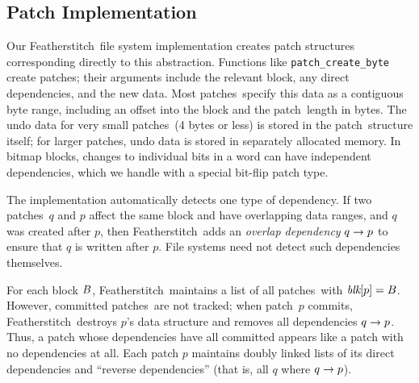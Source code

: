 \documentclass[9pt,twocolumn,letterpaper]{article}
\newcommand{\Kudos}{Featherstitch}
\newcommand{\patch}{patch}
\newcommand{\patches}{patches}
\begin{document}

\subsection{Patch Implementation}
\label{sec:patch:noop}

Our \Kudos\ file system implementation creates patch structures
corresponding directly to this abstraction.
%
Functions like \texttt{patch\_\-create\_\-byte} create patches;
%
their arguments include the relevant block, any
direct dependencies, and the new data.
%
Most \patches\ specify this data as a contiguous byte range, including an
offset into the block and the \patch\ length in bytes.
%
The undo data for very small \patches\ (4 bytes or less) is stored in the
\patch\ structure itself; for larger \patches, undo data is stored in
separately allocated memory.
%
In bitmap blocks, changes to individual bits in a word can have independent
dependencies, which we handle with a special bit-flip patch type.


The implementation automatically detects one type of dependency.
%
If two \patches\ $q$ and $p$ affect the same block and have overlapping data
ranges, and $q$ was created after $p$, then \Kudos\ adds an \emph{overlap
dependency} $q \rightarrow p$ to ensure that $q$ is written after $p$.
%
File systems need not detect such
dependencies themselves.


For each block $B$, \Kudos\ maintains a list of all \patches\ with
$\textit{blk}[{p}] = B$.
%
However, committed \patches\ are not tracked; when
\patch\ $p$ commits, \Kudos\ destroys $p$'s data structure and removes all
dependencies $q \rightarrow p$.
%
Thus, a patch whose dependencies have all committed appears like a patch
with no dependencies at all.
%
Each patch $p$ maintains doubly linked lists of its direct dependencies
and ``reverse dependencies'' (that is, all $q$ where $q
\rightarrow p$).
\end{document}
